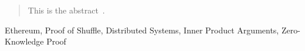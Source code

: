 
\begin{abstract}
    This is the abstract~\cite{greenwade1993}.
\end{abstract}

\begin{IEEEkeywords}
    Ethereum, Proof of Shuffle, Distributed Systems, Inner Product Arguments, Zero-Knowledge Proof
\end{IEEEkeywords}
